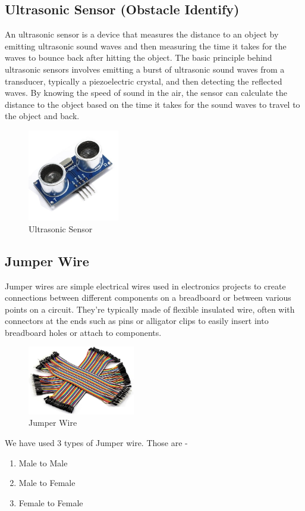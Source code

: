 \documentclass[conference]{IEEEtran}
\begin{document}
\subsection{Ultrasonic Sensor (Obstacle Identify)}

An ultrasonic sensor is a device that measures the distance to an object by emitting ultrasonic sound waves and then measuring the time it takes for the waves to bounce back after hitting the object. The basic principle behind ultrasonic sensors involves emitting a burst of ultrasonic sound waves from a transducer, typically a piezoelectric crystal, and then detecting the reflected waves. By knowing the speed of sound in the air, the sensor can calculate the distance to the object based on the time it takes for the sound waves to travel to the object and back.
\begin{figure}[h]
    \centering
    \includegraphics[height=4cm,width=\linewidth]{images/ultrasonic sensor.jpg}
    \caption{Ultrasonic Sensor}
    \label{fig:enter-label}
\end{figure}

\subsection{Jumper Wire}

Jumper wires are simple electrical wires used in electronics projects to create connections between different components on a breadboard or between various points on a circuit. They're typically made of flexible insulated wire, often with connectors at the ends such as pins or alligator clips to easily insert into breadboard holes or attach to components.
\begin{figure}[h]
    \centering
    \includegraphics[height=3cm,width=\linewidth]{images/71zMG84YhsL._AC_UF1000,1000_QL80_.jpg}
    \caption{Jumper Wire}
    \label{fig:enter-label}
\end{figure}
We have used 3 types of Jumper wire. Those are - 
\begin{enumerate}
    \item Male to Male
    \item Male to Female
    \item Female to Female
\end{enumerate}
\end{document}
